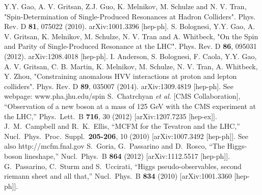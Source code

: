\documentclass[aps,superscriptaddress,nofootinbib]{revtex4}
\begin{document}
\begin{thebibliography}{99}
Y.Y. Gao, A. V. Gritsan, Z.J. Guo, K. Melnikov, M. Schulze and N. V. Tran, "Spin-Determination of Single-Produced Resonances at Hadron Colliders". Phys. Rev. D {\bf 81}, 075022 (2010). arXiv:1001.3396 [hep-ph].
S. Bolognesi, Y.Y. Gao, A. V. Gritsan, K. Melnikov, M. Schulze, N. V. Tran and A. Whitbeck, "On the Spin and Parity of Single-Produced Resonance at the LHC". Phys. Rev. D {\bf 86}, 095031 (2012). arXiv:1208.4018 [hep-ph].
I. Anderson, S. Bolognesi, F. Caola, Y.Y. Gao, A. V. Gritsan, C. B. Martin, K. Melnikov, M. Schulze, N. V. Tran, A. Whitbeck, Y. Zhou, "Constraining anomalous HVV interactions at proton and lepton colliders". Phys. Rev. D {\bf 89}, 035007 (2014). arXiv:1309.4819 [hep-ph].
See webpage: www.pha.jhu.edu/spin
  S.~Chatrchyan {\it et al.}  [CMS Collaboration],
  ``Observation of a new boson at a mass of 125 GeV with the CMS experiment at the LHC,''
  Phys.\ Lett.\ B {\bf 716}, 30 (2012)
  [arXiv:1207.7235 [hep-ex]].
  J.~M.~Campbell and R.~K.~Ellis,
  ``MCFM for the Tevatron and the LHC,''
  Nucl.\ Phys.\ Proc.\ Suppl.\  {\bf 205-206}, 10 (2010)
  [arXiv:1007.3492 [hep-ph]].
  See also http://mcfm.fnal.gov
  S.~Goria, G.~Passarino and D.~Rosco,
  ``The Higgs-boson lineshape,''
  Nucl.\ Phys.\ B  {\bf 864} (2012)
  [arXiv:1112.5517 [hep-ph]].
  G.~Passarino, C.~Sturm and S.~Uccirati, 
  ``Higgs pseudo-observables, second riemann sheet and all that,''
  Nucl.\ Phys.\ B {\bf 834} (2010)
  [arXiv:1001.3360 [hep-ph]].

\end{thebibliography}
\end{document}

